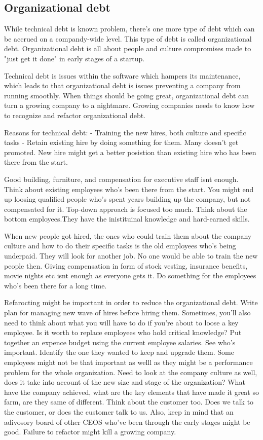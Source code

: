 \subsection{Organizational debt}
While technical debt is known problem, there's one more type of debt which can be accrued on a compandy-wide level. This type of debt is called organizational debt. Organizational debt is all about people and culture compromises made to "just get it done" in early stages of a startup\cite{steve-blank}.  

Technical debt is issues within the software which hampers its maintenance, which leads to that organizational debt is issues preventing a company from running smoothly. When things should be going great, organizational debt can turn a growing company to a nightmare. Growing companies needs to know how to recognize and refactor organizational debt. 

Reasons for technical debt:
- Training the new hires, both culture and specific tasks
- Retain existing hire by doing something for them. Many doesn't get promoted. New hire might get a better posistion than existing hire who has been there from the start.

Good building, furniture, and compensation for executive staff isnt enough. Think about existing employees who's been there from the start. You might end up loosing qualified people who's spent years building up the company, but not compensated for it. Top-down approach is focused too much. Think about the bottom employees.They have the inistituinal knowledge and hard-earned skills.

When new people got hired, the ones who could train them about the company culture and how to do their specific tasks is the old employees who's being underpaid. They will look for another job. No one would be able to train the new people then. Giving compensation in form of stock vesting, insurance benefits, movie nights etc isnt enough as everyone gets it. Do something for the employees who's been there for a long time.

Refarocting might be important in order to reduce the organizational debt. Write plan for managing new wave of hires before hiring them. Sometimes, you'll also need to think about what you will have to do if you're about to loose a key employee. Is it worth to replace employees who hold critical knowledge? Put together an expence budget using the current employee salaries. See who's important. Identify the one they wanted to keep and upgrade them. Some employees might not be that important as welll as they might be a performance problem for the whole organization. Need to look at the company culture as well, does it take into account of the new size and stage of the organization? What have the company achieved, what are the key elements that have made it great so farm, are they same of different. Think about the customer too. Does we talk to the customer, or does the customer talk to us. Also, keep in mind that an adivosory board of other CEOS who've been through the early stages might be good. Failure to refactor might kill a growing company. 


